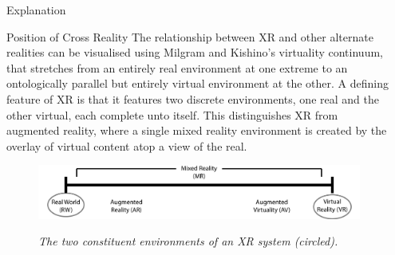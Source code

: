 \documentclass[final,t]{beamer}
\begin{document}
\begin{frame}
\begin{columns}[t]
\begin{column}{.31\linewidth}
\begin{block}{Explanation}
		\end{block}

		\begin{block}{Position of Cross Reality}
			The relationship between XR and other alternate realities can be visualised using Milgram and Kishino's virtuality continuum, that stretches from an entirely real environment at one extreme to an ontologically parallel but entirely virtual environment at the other. A defining feature of XR is that it features two discrete environments, one real and the other virtual, each complete unto itself. This distinguishes XR from augmented reality, where a single mixed reality environment is created by the overlay of virtual content atop a view of the real.	
			
			\begin{figure}[h]
				\begin{center}
					\includegraphics[width=\linewidth]{images/virtuality-continuum-cross-reality-1.png}

					\textit{The two constituent environments of an XR system (circled).}
				\end{center}
			\end{figure}		
			
		\end{block}

  \end{column}

    
    \begin{column}{.31\linewidth}


\end{column}
\end{columns}
\end{frame}
\end{document}
